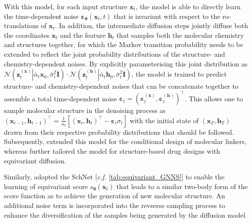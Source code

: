 With this model, for each input structure $\bm{x}_t$, the model is able to directly learn the time-dependent noise $\boldsymbol{\varepsilon}_{\boldsymbol{\theta}}(\bm{x}_t,t)$ that is invariant with respect to  the ro-translations of $\bm{x}_t$. In addition, the intermediate diffusion steps jointly diffuse both the coordinates $\bm{x}_{t}$ and the feature $\bm{h}_{t}$ that samples both the molecular chemistry and structures together, for which the Markov transition probability\cite{xu2022geodiff} needs to be extended to reflect the joint probability distributions of the structure- and chemistry-dependent noises. By explicitly parameterising this joint distribution as $\mathcal{N}\left(\left .\bm{z}_t^{(\bm{x})}\right\vert \bar{\alpha}_t\bm{x}_0,\bar{\sigma}_t^2\bm{I}\right)\cdot \mathcal{N}\left(\left .\bm{z}_t^{(\bm{h})}\right\vert \bar{\alpha}_t\bm{h}_0,\bar{\sigma}_t^2\bm{I}\right)$, the model is trained to predict structure- and chemistry-dependent noises that can be concatenate together to assemble a total time-dependent noise $\boldsymbol{\varepsilon}_t=(\boldsymbol{\varepsilon}_t^{(\bm{x})},\boldsymbol{\varepsilon}_t^{(\bm{h})})^\top$. This allows one to sample molecular structure in the denoising process as $(\bm{x}_{t-1},\bm{h}_{t-1})^\top=\frac{1}{\alpha_t}[(\bm{x}_{t},\bm{h}_{t})^\top-\boldsymbol{\varepsilon}_t\sigma_t]$ with the initial state of $(\bm{x}_T,\bm{h}_T)$ drawn from their respective probability distributions that should be followed. Subsequently, \citet{igashov2024equivariant} extended this model for the conditional design of molecular linkers, whereas \citet{schneuing2024structure} further tailored the model for structure-based drug designs with equivariant diffusion.

Similarly, \citet{huang2023mdm}  adopted the SchNet\cite{schutt2017schnet} [\emph{c.f.} \cref{tab:equivariant_GNNS}] to enable the learning of equivariant score $s_{\boldsymbol{\theta}}(\bm{x}_t)$ that leads to a similar two-body form of the score function as \citet{shi2021learning} to achieve the generation of new molecular structure. An additional noise term is incorporated into the revserse sampling process to enhance the diversification of the samples being generated by the diffusion model


